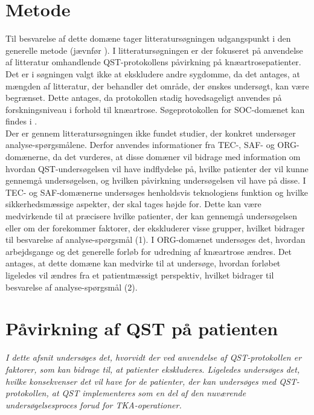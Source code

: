 \section{Metode}
Til besvarelse af dette domæne tager litteratursøgningen udgangspunkt i den generelle metode (jævnfør ). I litteratursøgningen er der fokuseret på anvendelse af litteratur omhandlende QST-protokollens påvirkning på knæartrosepatienter. Det er i søgningen valgt ikke at ekskludere andre sygdomme, da det antages, at mængden af litteratur, der behandler det område, der ønskes undersøgt, kan være begrænset. Dette antages, da protokollen stadig hovedsageligt anvendes på forskningsniveau i forhold til knæartrose. Søgeprotokollen for SOC-domænet kan findes i . \\
Der er gennem litteratursøgningen ikke fundet studier, der konkret undersøger analyse-spørgsmålene. Derfor anvendes informationer fra TEC-, SAF- og ORG-domænerne, da det vurderes, at disse domæner vil bidrage med information om hvordan QST-undersøgelsen vil have indflydelse på, hvilke patienter der vil kunne gennemgå undersøgelsen, og hvilken påvirkning undersøgelsen vil have på disse. I TEC- og SAF-domænerne undersøges henholdsvis teknologiens funktion og hvilke sikkerhedsmæssige aspekter, der skal tages højde for. Dette kan være medvirkende til at præcisere hvilke patienter, der kan gennemgå undersøgelsen eller om der forekommer faktorer, der ekskluderer visse grupper, hvilket bidrager til besvarelse af analyse-spørgsmål (1). I ORG-domænet undersøges det, hvordan arbejdsgange og det generelle forløb for udredning af knæartrose ændres. Det antages, at dette domæne kan medvirke til at undersøge, hvordan forløbet ligeledes vil ændres fra et patientmæssigt perspektiv, hvilket bidrager til besvarelse af analyse-spørgsmål (2). 
 
\section{Påvirkning af QST på patienten}
\textit{I dette afsnit undersøges det, hvorvidt der ved anvendelse af QST-protokollen er faktorer, som kan bidrage til, at patienter ekskluderes. Ligeledes undersøges det, hvilke konsekvenser det vil have for de patienter, der kan undersøges med QST-protokollen, at QST implementeres som en del af den nuværende undersøgelsesproces forud for TKA-operationer.}

